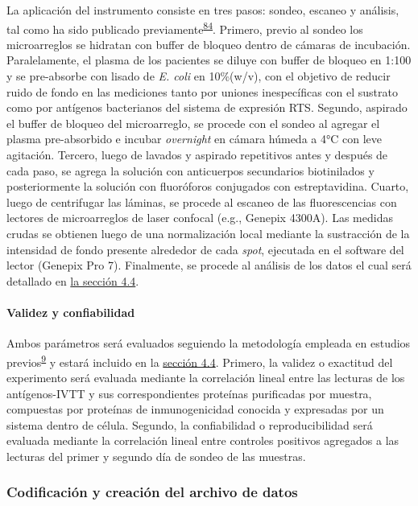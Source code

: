 \documentclass[]{article}
\let\oldparagraph\paragraph
\renewcommand{\paragraph}[1]{\oldparagraph{#1}\mbox{}}
\begin{document}
La aplicación del instrumento consiste en tres pasos: sondeo, escaneo y
análisis, tal como ha sido publicado
previamente\textsuperscript{\protect\hyperlink{ref-Driguez2015}{84}}.
Primero, previo al sondeo los microarreglos se hidratan con buffer de
bloqueo dentro de cámaras de incubación. Paralelamente, el plasma de los
pacientes se diluye con buffer de bloqueo en 1:100 y se pre-absorbe con
lisado de \emph{E. coli} en 10\%(w/v), con el objetivo de reducir ruido
de fondo en las mediciones tanto por uniones inespecíficas con el
sustrato como por antígenos bacterianos del sistema de expresión RTS.
Segundo, aspirado el buffer de bloqueo del microarreglo, se procede con
el sondeo al agregar el plasma pre-absorbido e incubar \emph{overnight}
en cámara húmeda a 4°C con leve agitación. Tercero, luego de lavados y
aspirado repetitivos antes y después de cada paso, se agrega la solución
con anticuerpos secundarios biotinilados y posteriormente la solución
con fluoróforos conjugados con estreptavidina. Cuarto, luego de
centrifugar las láminas, se procede al escaneo de las fluorescencias con
lectores de microarreglos de laser confocal (e.g., Genepix 4300A). Las
medidas crudas se obtienen luego de una normalización local mediante la
sustracción de la intensidad de fondo presente alrededor de cada
\emph{spot}, ejecutada en el software del lector (Genepix Pro 7).
Finalmente, se procede al análisis de los datos el cual será detallado
en \protect\hyperlink{procanal}{la sección 4.4}.

\hypertarget{validez}{\paragraph{Validez y
confiabilidad}\label{validez}}

Ambos parámetros será evaluados seguiendo la metodología empleada en
estudios
previos\textsuperscript{\protect\hyperlink{ref-crompton2010}{9}} y
estará incluido en la \protect\hyperlink{procanal}{sección 4.4}.
Primero, la validez o exactitud del experimento será evaluada mediante
la correlación lineal entre las lecturas de los antígenos-IVTT y sus
correspondientes proteínas purificadas por muestra, compuestas por
proteínas de inmunogenicidad conocida y expresadas por un sistema dentro
de célula. Segundo, la confiabilidad o reproducibilidad será evaluada
mediante la correlación lineal entre controles positivos agregados a las
lecturas del primer y segundo día de sondeo de las muestras.

\subsubsection{Codificación y creación del archivo de
datos}\label{codificacion-y-creacion-del-archivo-de-datos}
\end{document}
